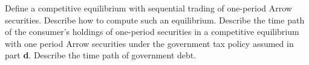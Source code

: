  \medskip
   Define a competitive equilibrium with sequential trading of one-period Arrow securities.  Describe how to compute such an equilibrium. Describe the time path of the
 consumer's holdings of one-period securities  in a competitive equilibrium with one period Arrow securities
 under the government tax policy assumed in part {\bf d}. Describe the time path of government debt.






%
%
%
%
%
%
